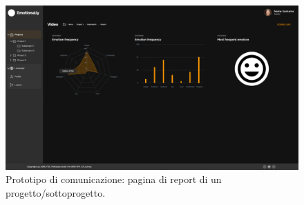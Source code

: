 \begin{figure}[H]
	\centering
	\caption{Prototipo di comunicazione: pagina di report di un progetto/sottoprogetto.}
	\label{fig:prototipo-comunicazione:project-report}
	\includegraphics[width=\textwidth]{images/prototipo-comunicazione/report-project.png}
\end{figure}
